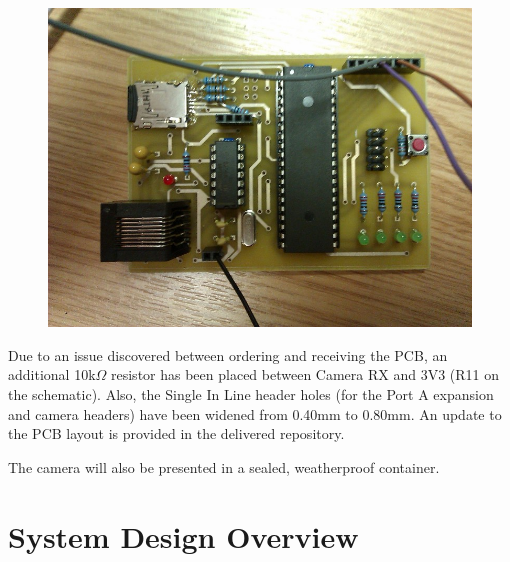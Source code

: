 \begin{figure}[H]
        \centering
        \includegraphics[width=1.00\textwidth]{figures/PayloadImplementation.jpg}
        \label{fig:PayloadImplementation}
\end{figure}

Due to an issue discovered between ordering and receiving the PCB, an 
additional 10k$\Omega$ resistor has been placed between Camera RX and 3V3 (R11 
on the schematic). Also, the Single In Line header holes (for the Port A 
expansion and camera headers) have been widened from 0.40mm to 0.80mm. An 
update to the PCB layout is provided in the delivered repository.

The camera will also be presented in a sealed, weatherproof container.

\section{System Design Overview}

